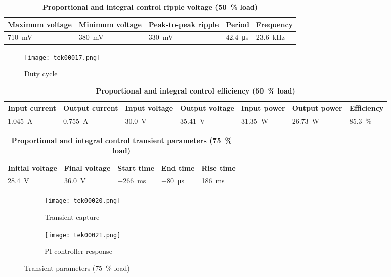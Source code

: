 \begin{table}[H]
    \centering
    \caption{\textbf{Proportional and integral control ripple voltage (\qty{50}{\percent} load)}}
    \begin{tabularx}{\columnwidth}{|X|X|X|X|X|}
        \hline
        Maximum voltage        & Minimum voltage        & Peak-to-peak ripple & Period          & Frequency        \\
        \hline
        \qty{710}{\milli\volt} & \qty{380}{\milli\volt} & \qty{330}{\mV}      & \qty{42.4}{\us} & \qty{23.6}{\kHz} \\
        \hline
    \end{tabularx}
    \label{table:pi50ripple}
\end{table}

\begin{figure}[H]
    \centering
    \texttt{[image: tek00017.png]}
    \caption{Duty cycle}
\end{figure}

\begin{table}[H]
    \centering
    \caption{\textbf{Proportional and integral control efficiency (\qty{50}{\percent} load)}}
    \begin{tabularx}{\columnwidth}{|X|X|X|X|X|X|X|}
        \hline
        Input current        & Output current       & Input voltage  & Output voltage  & Input power        & Output power       & Efficiency           \\
        \hline
        \qty{1.045}{\ampere} & \qty{0.755}{\ampere} & \qty{30.0}{\V} & \qty{35.41}{\V} & \qty{31.35}{\watt} & \qty{26.73}{\watt} & \qty{85.3}{\percent} \\
        \hline
    \end{tabularx}
\end{table}

\begin{table}[H]
    \centering
    \caption{\textbf{Proportional and integral control transient parameters (\qty{75}{\percent} load)}}
    \begin{tabularx}{\columnwidth}{|X|X|X|X|X|}
        \hline
        Initial voltage   & Final voltage     & Start time      & End time       & Rise time      \\
        \hline
        \qty{28.4}{\volt} & \qty{36.0}{\volt} & \qty{-266}{\ms} & \qty{-80}{\us} & \qty{186}{\ms} \\
        \hline
    \end{tabularx}
\end{table}
\begin{figure}[H]
    \begin{subfigure}{0.5\textwidth}
        \texttt{[image: tek00020.png]}
        \caption{Transient capture}
    \end{subfigure}
    \hfill
    \begin{subfigure}{0.5\textwidth}
        \texttt{[image: tek00021.png]}
        \caption{PI controller response}
    \end{subfigure}
    \caption{Transient parameters (\qty{75}{\percent} load)}
\end{figure}

